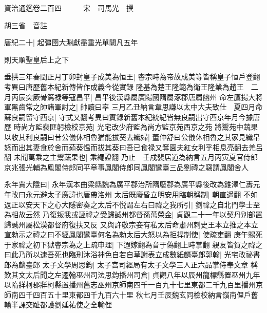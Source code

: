 資治通鑑卷二百四　　　宋　司馬光　撰

胡三省　音註

唐紀二十|{
	起彊圉大淵獻盡重光單闕凡五年}


則天順聖皇后上之下

垂拱三年春閏正月丁卯封皇子成美為恒王|{
	睿宗時為帝故成美等皆稱皇子恒戶登翻　考異曰唐歷舊本紀新傳皆作成義今從實録}
隆基為楚王隆範為衛王隆業為趙王　二月丙辰突厥骨篤禄等寇昌平|{
	昌平後漢縣屬廣陽國隋屬涿郡唐屬幽州}
命左鷹揚大將軍黑齒常之帥諸軍討之|{
	帥讀曰率}
三月乙丑納言韋思謙以太中大夫致仕　夏四月命蘇良嗣留守西京|{
	守式又翻考異曰實録新舊本紀統紀皆無良嗣出守西京年月今據唐歷}
時尚方監裴匪躬檢校京苑|{
	光宅改少府監為尚方監京苑西京之苑}
將鬻苑中蔬果以收其利良嗣曰昔公儀休相魯猶能拔葵去織婦|{
	董仲舒曰公儀休相魯之其家見織帛怒而出其妻食於舍而茹葵愠而拔其葵曰吾已食禄又奪園夫紅女利乎相息亮翻去羌呂翻}
未聞萬乘之主鬻蔬果也|{
	乘繩證翻}
乃止　壬戍裴居道為納言五月丙寅夏官侍郎京兆張光輔為鳳閣侍郎同平章事鳳閣侍郎同鳳閣鸞臺三品劉禕之竊謂鳳閣舍人

永年賈大隱曰|{
	永年漢本曲梁縣魏為廣平郡治所隋廢郡為廣平縣後改為雞澤仁夀元年改曰永元避太子廣諱也唐帶洺州}
太后既廢昏立明安用臨朝稱制|{
	朝直遥翻}
不如返正以安天下之心大隱密奏之太后不悦謂左右曰禕之我所引|{
	劉禕之自北門學士至為相故云然}
乃復叛我或誣禕之受歸誠州都督孫萬榮金|{
	貞觀二十一年以契丹别部置歸誠州屬松漠都督府復扶又反}
又與許敬宗妾有私太后命肅州刺史王本立推之本立宣勑示之禕之曰不經鳳閣鸞臺何名為勑太后大怒以為拒捍制使|{
	使疏吏翻}
庚午賜死于家禕之初下獄睿宗為之上疏申理|{
	下遐嫁翻為音于偽翻上時掌翻}
親友皆賀之禕之曰此乃所以速吾死也臨刑沐浴神色自若自草謝表立成數紙麟臺郎郭翰|{
	光宅改祕書郎為麟臺郎}
太子文學周思鈞|{
	太子宫司經局有太子文學三人正六品掌侍奉文章}
稱歎其文太后聞之左遷翰巫州司法思鈞播州司倉|{
	貞觀八年以辰州龍標縣置巫州九年以隋牂柯郡牂柯縣置播州舊志巫州京師南四千一百九十七里東都二千九百里播州京師南四千四百五十里東都四千九百六十里}
秋七月壬辰魏玄同檢校納言嶺南俚戶舊輸半課交趾都護劉延祐使之全輸俚

